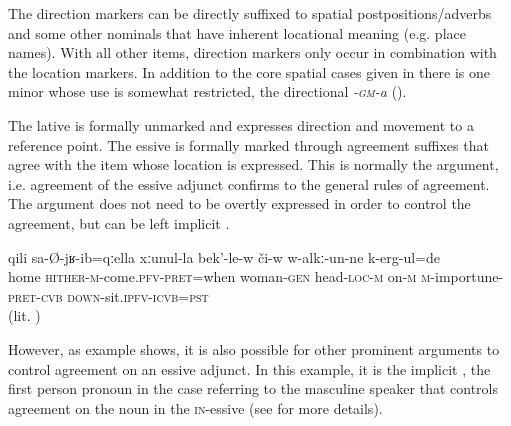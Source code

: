 The direction markers can be directly suffixed to spatial postpositions/adverbs and some other nominals that have inherent locational meaning (e.g. place names). With all other items, direction markers only occur in combination with the location markers. In addition to the core spatial cases given in  there is one minor  whose use is somewhat restricted, the directional \textit{-\textsc{gm}-a} (). 

%
%


The lative is formally unmarked and expresses direction and movement to a reference point. The essive is formally marked through  agreement suffixes that agree with the item whose location is expressed. This is normally the  argument, i.e. agreement of the essive adjunct confirms to the general rules of  agreement. The  argument does not need to be overtly expressed in order to control the agreement, but can be left implicit . 
%
\begin{exe}
	\ex	\label{ex:when he came come, he pestered his wife}
	\gll	qili	sa-Ø-jʁ-ib=qːella	xːunul-la	bek'-le-w	či-w	w-alkː-un-ne	k-erg-ul=de\\
		home	\textsc{hither-m}-come.\textsc{pfv}-\textsc{pret}=when	woman-\textsc{gen} head-\textsc{loc}-\textsc{m} on-\textsc{m} \textsc{m-}importune-\textsc{pret}-\textsc{cvb} \textsc{down}-sit.\textsc{ipfv}-\textsc{icvb}=\textsc{pst}\\
	\glt	{} (lit. )
\end{exe} 

However, as example  shows, it is also possible for other prominent arguments to control  agreement on an essive adjunct. In this example, it is the implicit , the first person pronoun in the  case referring to the masculine speaker that controls agreement on the noun in the \textsc{in}-essive (see  for more details). 

